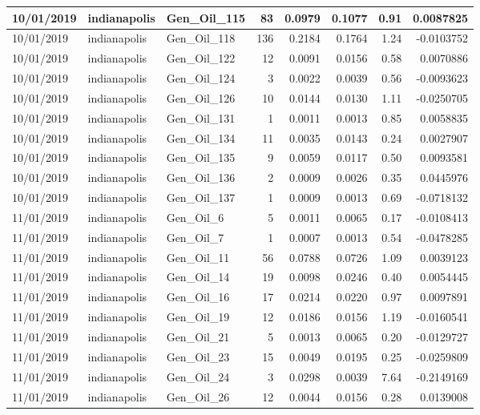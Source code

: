 \documentclass[
  letterpaper,
  DIV=11,
  numbers=noendperiod]{scrartcl}
\begin{document}
\begin{tabular}{l|l|l|r|r|r|r|r}
\hline
10/01/2019 & indianapolis & Gen\_Oil\_115 & 83 & 0.0979 & 0.1077 & 0.91 & 0.0087825\\
\hline
10/01/2019 & indianapolis & Gen\_Oil\_118 & 136 & 0.2184 & 0.1764 & 1.24 & -0.0103752\\
\hline
10/01/2019 & indianapolis & Gen\_Oil\_122 & 12 & 0.0091 & 0.0156 & 0.58 & 0.0070886\\
\hline
10/01/2019 & indianapolis & Gen\_Oil\_124 & 3 & 0.0022 & 0.0039 & 0.56 & -0.0093623\\
\hline
10/01/2019 & indianapolis & Gen\_Oil\_126 & 10 & 0.0144 & 0.0130 & 1.11 & -0.0250705\\
\hline
10/01/2019 & indianapolis & Gen\_Oil\_131 & 1 & 0.0011 & 0.0013 & 0.85 & 0.0058835\\
\hline
10/01/2019 & indianapolis & Gen\_Oil\_134 & 11 & 0.0035 & 0.0143 & 0.24 & 0.0027907\\
\hline
10/01/2019 & indianapolis & Gen\_Oil\_135 & 9 & 0.0059 & 0.0117 & 0.50 & 0.0093581\\
\hline
10/01/2019 & indianapolis & Gen\_Oil\_136 & 2 & 0.0009 & 0.0026 & 0.35 & 0.0445976\\
\hline
10/01/2019 & indianapolis & Gen\_Oil\_137 & 1 & 0.0009 & 0.0013 & 0.69 & -0.0718132\\
\hline
11/01/2019 & indianapolis & Gen\_Oil\_6 & 5 & 0.0011 & 0.0065 & 0.17 & -0.0108413\\
\hline
11/01/2019 & indianapolis & Gen\_Oil\_7 & 1 & 0.0007 & 0.0013 & 0.54 & -0.0478285\\
\hline
11/01/2019 & indianapolis & Gen\_Oil\_11 & 56 & 0.0788 & 0.0726 & 1.09 & 0.0039123\\
\hline
11/01/2019 & indianapolis & Gen\_Oil\_14 & 19 & 0.0098 & 0.0246 & 0.40 & 0.0054445\\
\hline
11/01/2019 & indianapolis & Gen\_Oil\_16 & 17 & 0.0214 & 0.0220 & 0.97 & 0.0097891\\
\hline
11/01/2019 & indianapolis & Gen\_Oil\_19 & 12 & 0.0186 & 0.0156 & 1.19 & -0.0160541\\
\hline
11/01/2019 & indianapolis & Gen\_Oil\_21 & 5 & 0.0013 & 0.0065 & 0.20 & -0.0129727\\
\hline
11/01/2019 & indianapolis & Gen\_Oil\_23 & 15 & 0.0049 & 0.0195 & 0.25 & -0.0259809\\
\hline
11/01/2019 & indianapolis & Gen\_Oil\_24 & 3 & 0.0298 & 0.0039 & 7.64 & -0.2149169\\
\hline
11/01/2019 & indianapolis & Gen\_Oil\_26 & 12 & 0.0044 & 0.0156 & 0.28 & 0.0139008\\

\end{tabular}
\end{document}
